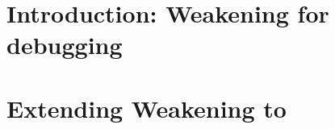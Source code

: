 \documentclass[
]{ceurart}
\newtheorem{example}{Example}
\begin{document}
\section{Introduction: Weakening for debugging}










\section{Extending Weakening to \SROIQ}
\end{document}
